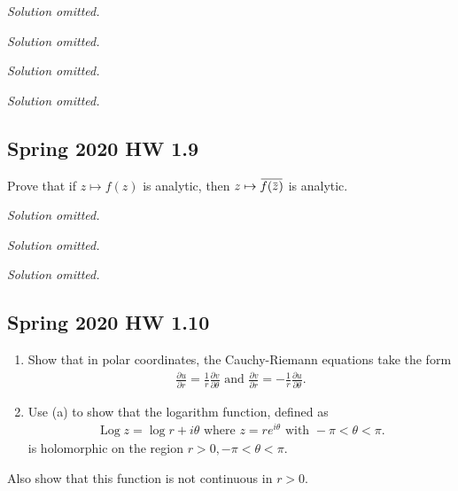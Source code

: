 \emph{Solution omitted.}

\emph{Solution omitted.}

\emph{Solution omitted.}

\emph{Solution omitted.}

\hypertarget{spring-2020-hw-1.9}{%
\subsection{Spring 2020 HW 1.9}\label{spring-2020-hw-1.9}}

\begin{problem}[?]

Prove that if \(z\mapsto f(z)\) is analytic, then
\(z \mapsto \mkern 1.5mu\overline{\mkern-1.5muf(\mkern 1.5mu\overline{\mkern-1.5muz\mkern-1.5mu}\mkern 1.5mu)\mkern-1.5mu}\mkern 1.5mu\)
is analytic.

\end{problem}

\emph{Solution omitted.}

\emph{Solution omitted.}

\emph{Solution omitted.}

\hypertarget{spring-2020-hw-1.10}{%
\subsection{Spring 2020 HW 1.10}\label{spring-2020-hw-1.10}}

\begin{problem}[?]

\envlist

\begin{enumerate}
\def\labelenumi{\alph{enumi}.}
\item
  Show that in polar coordinates, the Cauchy-Riemann equations take the
  form
  \begin{align*}
  \frac{\partial u}{\partial r}=\frac{1}{r} \frac{\partial v}{\partial \theta} \text { and } \frac{\partial v}{\partial r}=-\frac{1}{r} \frac{\partial u}{\partial \theta}
  .\end{align*}
\item
  Use (a) to show that the logarithm function, defined as
  \begin{align*}
  \operatorname{Log}z=\log r+i \theta \text { where } z=r e^{i \theta} \text { with }-\pi<\theta<\pi
  .\end{align*}
  is holomorphic on the region \(r> 0, -\pi < \theta < \pi\).
\end{enumerate}

Also show that this function is not continuous in \(r>0\).

\end{problem}


